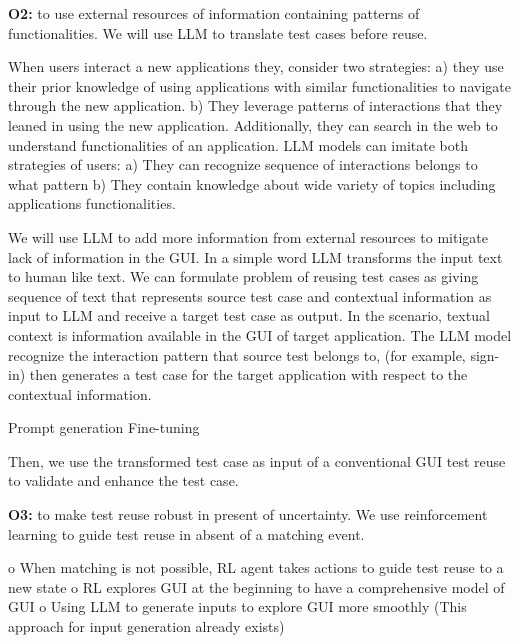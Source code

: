 \bigskip
\noindent
\textbf{O2:} to use external resources of information containing patterns of functionalities. We will use LLM to translate test cases before reuse.

\bigskip
When users interact a new applications they, consider two strategies: 
a) they use their prior knowledge of using applications with similar functionalities to navigate through the new application. 
b) They leverage patterns of interactions that they leaned  in using the new application. 
Additionally, they can search in the web to understand functionalities of an application. 
LLM models can imitate both strategies of users:
a) They can recognize sequence of interactions belongs to what pattern
b)  They contain knowledge about wide variety of topics including applications functionalities.

\bigskip
We will use LLM to add more information from external resources to mitigate lack of information in the GUI.
In a simple word LLM transforms the input text to human like text. 
We can formulate problem of reusing test cases as giving sequence of text that represents source test case and contextual information as input to LLM and receive a target test case as output.  
In the \testreuse scenario, textual context is information available in the GUI of target application. 
The LLM model recognize the interaction pattern that source test belongs to, (for example, sign-in) then generates a test case for the target application with respect to the contextual information.

\bigskip

Prompt generation
Fine-tuning

Then, we use the transformed test case as input of a conventional GUI test reuse to validate and enhance the test case. 

\bigskip
\noindent
\textbf{O3: }to make test reuse robust in present of uncertainty. We use reinforcement learning to guide test reuse in absent of a matching event.

o	When matching is not possible, RL agent takes actions to guide test reuse to a new state 
o	RL explores GUI at the beginning to have a comprehensive model of GUI
o	Using LLM to generate inputs to explore GUI more smoothly (This approach for input generation already exists)
